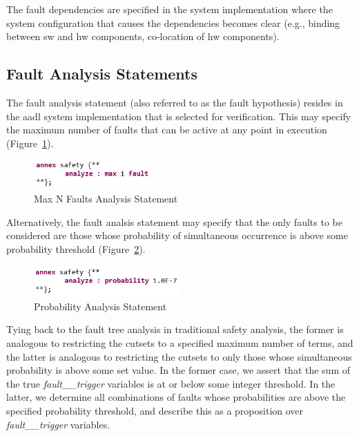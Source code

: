 The fault dependencies are specified in the system implementation where the system configuration that causes the dependencies becomes clear (e.g., binding between \gls{sw} and \gls{hw} components, co-location of \gls{hw} components). 


\subsection{Fault Analysis Statements}
\label{subsec:analysisStmts}
The fault analysis statement (also referred to as the fault hypothesis) resides in the \gls{aadl} system implementation that is selected for verification. This may specify the maximum number of faults that can be active at any point in execution (Figure~\ref{fig:hypothesisMaxN}).

\begin{figure}[h!]
	\vspace{-0.1in}
	\begin{center}
		\includegraphics[width=0.4\textwidth]{images/hypothesisMaxN.png}
	\end{center}
	\vspace{-0.1in}
	\caption{Max N Faults Analysis Statement}
	\label{fig:hypothesisMaxN}
\end{figure}
Alternatively, the fault analsis statement may specify that the only faults to be considered are those whose probability of simultaneous occurrence is above some probability threshold (Figure~\ref{fig:hypothesisProb}). 

\begin{figure}[h!]
	\vspace{-0.1in}
	\begin{center}
		\includegraphics[width=0.5\textwidth]{images/hypothesisProb.png}
	\end{center}
	\vspace{-0.1in}
	\caption{Probability Analysis Statement}
	\label{fig:hypothesisProb}
\end{figure}

Tying back to the fault tree analysis in traditional safety analysis, the former is analogous to restricting the cutsets to a specified maximum number of terms, and the latter is analogous to restricting the cutsets to only those whose simultaneous probability is above some set value. In the former case, we assert that the sum of the true {\em fault\_\_trigger} variables is at or below some integer threshold.  In the latter, we determine all combinations of faults whose probabilities are above the specified probability threshold, and describe this as a proposition over {\em fault\_\_trigger} variables. 

